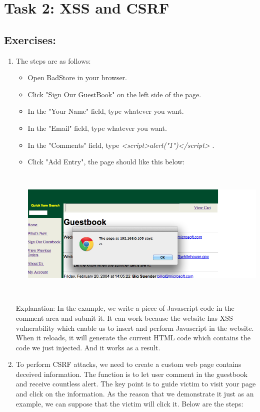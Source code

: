\section*{Task 2: XSS and CSRF}
\subsection*{Exercises:}
\begin{enumerate}
\item The steps are as follows: 
	\begin{itemize}
		\item Open BadStore in your browser.
		\item Click "Sign Our GuestBook" on the left side of the page.
		\item In the "Your Name" field, type whatever you want.
		\item In the "Email" field, type whatever you want.
		\item In the "Comments" field, type \textit{<script>alert("1")</script>} .
		\item Click "Add Entry", the page should like this below:
		\par
		\begin{center}\includegraphics[height=2.5in]{xss}
		\end{center}
	\end{itemize}
	\indent Explanation: In the example, we write a piece of Javascript code in the comment area and submit it. It can work because the website has XSS vulnerability which enable us to insert and perform Javascript in the website. When it reloads, it will generate the current HTML code which contains the code we just injected. And it works as a result.
	\item To perform CSRF attacks, we need to create a custom web page contains deceived information. The function is to let user comment in the guestbook and receive countless alert. The key point is to guide victim to visit your page and click on the information. As the reason that we demonstrate it just as an example, we can  suppose that the victim will click it. Below are the steps:

\end{enumerate}
